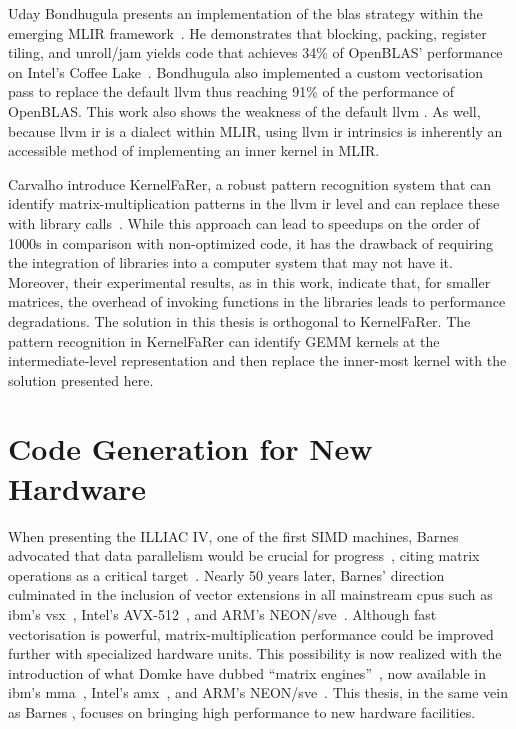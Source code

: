 \documentclass[\main/thesis.tex]{subfiles}
\begin{document}
Uday Bondhugula presents an implementation of the \gls{blas} strategy within the emerging MLIR framework~\autocite{bondhugula2020high}.
He demonstrates that blocking, packing, register tiling, and unroll/jam yields code that achieves 34\% of OpenBLAS' performance on Intel's Coffee Lake~\autocite{bondhugula2020high}.
Bondhugula also implemented a custom \gls{vectorisation} pass to replace the default \gls{llvm}  thus reaching 91\% of the performance of OpenBLAS.
This work also shows the weakness of the default \gls{llvm} .
As well, because \gls{llvm} \gls{ir} is a dialect within MLIR, using \gls{llvm} \gls{ir} \glspl{intrinsic} is inherently an accessible method of implementing an inner kernel in MLIR.

Carvalho \etal introduce KernelFaRer, a robust pattern recognition system that can identify matrix-multiplication patterns in the \gls{llvm} \gls{ir} level and can replace these with library calls~\autocite{carvalho2021kernelfarer}.
While this approach can lead to speedups on the order of 1000s in comparison with non-optimized code, it has the drawback of requiring the integration of libraries into a computer system that may not have it.
Moreover, their experimental results, as in this work, indicate that, for smaller matrices, the overhead of invoking functions in the libraries leads to performance degradations.
The solution in this thesis is orthogonal to KernelFaRer.
The pattern recognition in  KernelFaRer can identify GEMM kernels at the intermediate-level representation and then replace the inner-most kernel with the solution presented here.

\section{Code Generation for New Hardware}
When presenting the ILLIAC IV, one of the first SIMD machines, Barnes \etal advocated that data parallelism would be crucial for progress~\autocite{barnes1968illiac}, citing matrix operations as a critical target~\autocite{kuck1968illiac}.
Nearly 50 years later, Barnes' direction culminated in the inclusion of vector extensions in all mainstream \glspl{cpu} such as \gls{ibm}'s \gls{vsx}~\autocite{PowerISA}, Intel's AVX-512~\autocite{IntelISA}, and ARM's NEON/\gls{sve}~\autocite{ArmISA}.
Although fast \gls{vectorisation} is powerful, matrix-multiplication performance could be improved further with specialized hardware units.
This possibility is now realized with the introduction of what Domke \etal have dubbed ``matrix engines''~\autocite{domke2021matrix}, now available in \gls{ibm}'s \gls{mma}~\autocite{PowerISA}, Intel's \gls{amx}~\autocite{IntelISA}, and ARM's NEON/\gls{sve}~\autocite{ArmISA}.
This thesis, in the same vein as Barnes \etal, focuses on bringing high performance to new hardware facilities.
\end{document}
